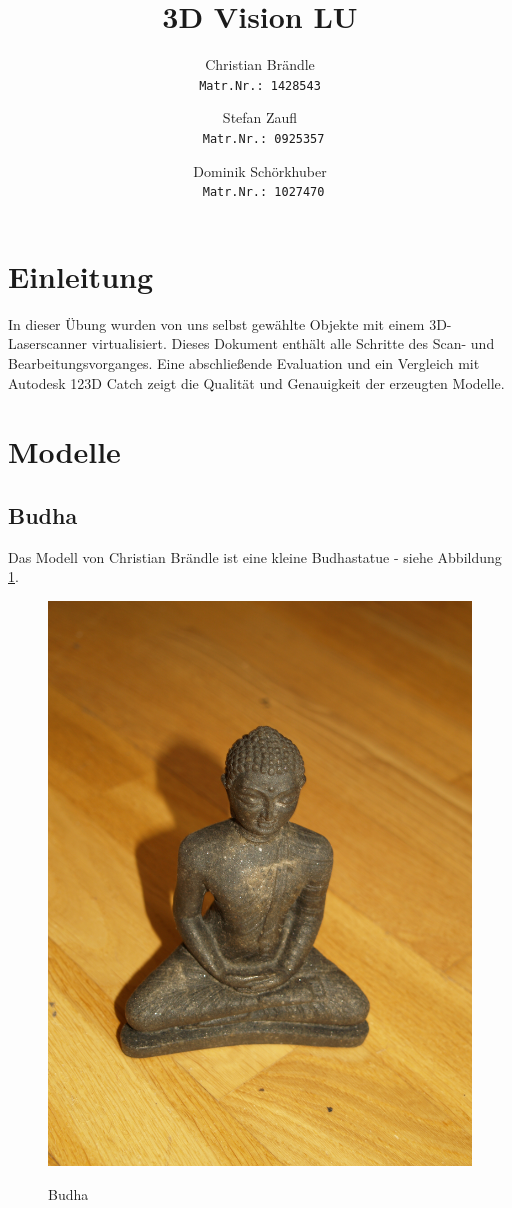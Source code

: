 \documentclass[]{article}
\title{3D Vision LU}
\author{Christian Br\"andle \\
\texttt{Matr.Nr.: 1428543}
\and Stefan Zaufl \\
\texttt{ Matr.Nr.: 0925357}
\and Dominik Sch\"orkhuber\\
\texttt{ Matr.Nr.: 1027470}}
\begin{document}
\maketitle


\section{Einleitung}  %
In dieser Übung wurden von uns selbst gewählte Objekte mit einem 3D-Laserscanner virtualisiert. Dieses Dokument enthält alle Schritte des Scan- und Bearbeitungsvorganges. Eine abschließende Evaluation und ein Vergleich mit Autodesk 123D Catch zeigt die Qualität und Genauigkeit der erzeugten Modelle. 

\section{Modelle}
\subsection{Budha}

Das Modell von Christian Brändle ist eine kleine Budhastatue - siehe Abbildung \ref{fig:budha_org}.
\begin{figure}[H]
\caption{Budha}
\centering
\includegraphics[scale=0.4]{images/Budha/Budha_Original.jpg}
\label{fig:budha_org}
\end{figure}
\end{document}
